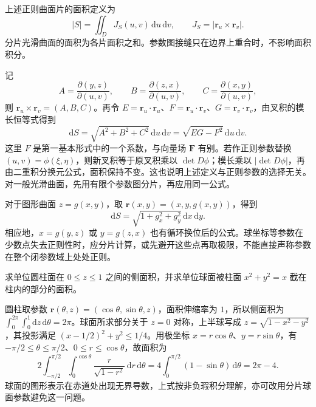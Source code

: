 \begin{definition}
\label{def:surface-area-parametric}
上述正则曲面片的面积定义为
\begin{equation}
\label{eq:surface-area-parametric}
    |S|=\iint_D J_S(u,v)\,\mathrm du\,\mathrm dv,
    \qquad J_S=|\boldsymbol r_u\times\boldsymbol r_v|.
\end{equation}
分片光滑曲面的面积为各片面积之和。参数图接缝只在边界上重合时，不影响面积积分。
\end{definition}

记
\begin{equation}
\label{eq:surface-normal-minors}
    A=\frac{\partial(y,z)}{\partial(u,v)},\qquad
    B=\frac{\partial(z,x)}{\partial(u,v)},\qquad
    C=\frac{\partial(x,y)}{\partial(u,v)},
\end{equation}
则 $\boldsymbol r_u\times\boldsymbol r_v=(A,B,C)$。再令 $E=\boldsymbol r_u\cdot\boldsymbol r_u$、$F=\boldsymbol r_u\cdot\boldsymbol r_v$、$G=\boldsymbol r_v\cdot\boldsymbol r_v$，由叉积的模长恒等式得到
\begin{equation}
\label{eq:surface-area-element}
    \mathrm dS=\sqrt{A^2+B^2+C^2}\,\mathrm du\,\mathrm dv
    =\sqrt{EG-F^2}\,\mathrm du\,\mathrm dv.
\end{equation}
这里 $F$ 是第一基本形式中的一个系数，与向量场 $\boldsymbol F$ 有别。若作正则参数替换 $(u,v)=\phi(\xi,\eta)$，则新叉积等于原叉积乘以 $\det D\phi$；模长乘以 $|\det D\phi|$，再由二重积分换元公式，面积保持不变。这也说明上述定义与正则参数的选择无关。对一般光滑曲面，先用有限个参数图分片，再应用同一公式。

对于图形曲面 $z=g(x,y)$，取 $\boldsymbol r(x,y)=(x,y,g(x,y))$，得到
\begin{equation}
\label{eq:surface-area-graph}
    \mathrm dS=\sqrt{1+g_x^2+g_y^2}\,\mathrm dx\,\mathrm dy.
\end{equation}
相应地，$x=g(y,z)$ 或 $y=g(z,x)$ 也有循环换位后的公式。球坐标等参数在少数点失去正则性时，应分片计算，或先避开这些点再取极限，不能直接声称参数在整个闭参数域上处处正则。

\begin{example}
\label{ex:surface-area-cylinder-and-sphere}
求单位圆柱面在 $0\leq z\leq1$ 之间的侧面积，并求单位球面被柱面 $x^2+y^2=x$ 截在柱内的部分的面积。
\end{example}
\begin{solve}
圆柱取参数 $\boldsymbol r(\theta,z)=(\cos\theta,\sin\theta,z)$，面积伸缩率为 $1$，所以侧面积为 $\int_0^{2\pi}\int_0^1\mathrm dz\,\mathrm d\theta=2\pi$。球面所求部分关于 $z=0$ 对称，上半球写成 $z=\sqrt{1-x^2-y^2}$，其投影满足 $(x-1/2)^2+y^2\leq1/4$。用极坐标 $x=r\cos\theta$、$y=r\sin\theta$，有 $-\pi/2\leq\theta\leq\pi/2$、$0\leq r\leq\cos\theta$，故面积为
\[
    2\int_{-\pi/2}^{\pi/2}\int_0^{\cos\theta}
    \frac r{\sqrt{1-r^2}}\,\mathrm dr\,\mathrm d\theta
    =4\int_0^{\pi/2}(1-\sin\theta)\,\mathrm d\theta=2\pi-4.
\]
球面的图形表示在赤道处出现无界导数，上式按非负瑕积分理解，亦可改用分片球面参数避免这一问题。
\end{solve}

